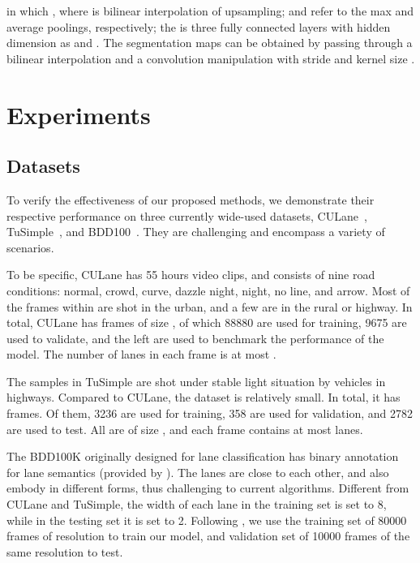 \documentclass[preprint,12pt,review]{elsarticle}
\begin{document}
in which , where  is bilinear interpolation of  upsampling;  and  refer to the max and average poolings, respectively; the  is three fully connected layers with hidden dimension as  and . The segmentation maps can be obtained by passing  through a  bilinear interpolation and a convolution manipulation with stride  and kernel size .

\section{Experiments}
\subsection{Datasets}
To verify the effectiveness of our proposed methods, we demonstrate their respective performance on three currently wide-used datasets, CULane~\cite{SCNN}, TuSimple~\cite{tusimple}, and BDD100~\cite{bdd}. They are challenging and encompass a variety of scenarios. 

To be specific, CULane has 55 hours video clips, and consists of nine road conditions:  normal, crowd, curve, dazzle night, night, no line, and arrow. Most of the frames within are shot in the urban, and a few are in the rural or highway. In total, CULane has  frames of size , of which 88880 are used for training, 9675 are used to validate, and the left are used to benchmark the performance of the model. The number of lanes in each frame is at most .

The samples in TuSimple are shot under stable light situation by vehicles in highways. Compared to CULane, the dataset is relatively small. In total, it has  frames. Of them, 3236 are used for training, 358 are used for validation, and 2782 are used to test. All are of size , and each frame contains at most  lanes. 

The BDD100K originally designed for lane classification has binary annotation for lane semantics (provided by \cite{distillation}). The lanes are close to each other, and also embody in different forms, thus challenging to current algorithms. Different from CULane and TuSimple, the width of each lane in the training set is set to 8, while in the testing set it is set to 2. Following \cite{distillation}, we use the training set of 80000 frames of resolution  to train our model, and validation set of 10000 frames of the same resolution to test.
\end{document}
